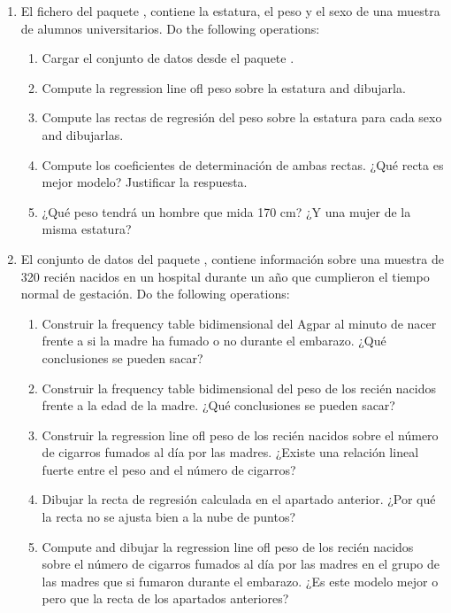 \begin{enumerate}[leftmargin=*]
\item El fichero  del paquete , contiene la estatura, el peso y
el sexo de una muestra de alumnos universitarios.
Do the following operations:
\begin{enumerate}
\item Cargar el conjunto de datos  desde el paquete .
\item Compute la regression line ofl peso sobre la estatura and dibujarla.
\item Compute las rectas de regresión del peso sobre la estatura para cada sexo and dibujarlas.
\item Compute los coeficientes de determinación de ambas rectas. ¿Qué recta es mejor modelo? Justificar la respuesta.
\item ¿Qué peso tendrá un hombre que mida 170 cm? ¿Y una mujer de la misma estatura?
\end{enumerate}

\item El conjunto de datos  del paquete , contiene información sobre una
muestra de 320 recién nacidos en un hospital durante un año que cumplieron el tiempo normal de gestación. 
Do the following operations:
\begin{enumerate}
\item Construir la frequency table bidimensional del Agpar al minuto de nacer frente a si la madre ha fumado o no
durante el embarazo. ¿Qué conclusiones se pueden sacar?
\item Construir la frequency table bidimensional del peso de los recién nacidos frente a la edad de la madre. ¿Qué
conclusiones se pueden sacar?
\item Construir la regression line ofl peso de los recién nacidos sobre el número de cigarros fumados al día por las
madres. ¿Existe una relación lineal fuerte entre el peso and el número de cigarros?
\item Dibujar la recta de regresión calculada en el apartado anterior. ¿Por qué la recta no se ajusta bien a la nube de
puntos?
\item Compute and dibujar la regression line ofl peso de los recién nacidos sobre el número de cigarros fumados al día
por las madres en el grupo de las madres que si fumaron durante el embarazo. ¿Es este modelo mejor o pero que la recta
de los apartados anteriores? 


\end{enumerate}
\end{enumerate}
